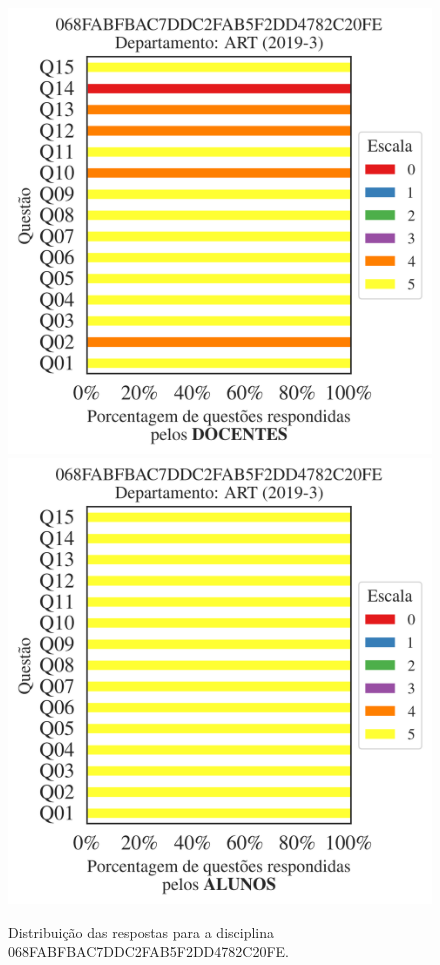 \documentclass[a4paper,10pt]{article}
\begin{document}
\begin{figure}[h]
\centering
\includegraphics[width=0.485\linewidth]{analise_disciplina_departamento_ART_068FABFBAC7DDC2FAB5F2DD4782C20FE_docentes.png}
\includegraphics[width=0.485\linewidth]{analise_disciplina_departamento_ART_068FABFBAC7DDC2FAB5F2DD4782C20FE_alunos.png}
\caption{\label{fig:analise_geral_departamento}                Distribuição das respostas para a disciplina 068FABFBAC7DDC2FAB5F2DD4782C20FE. }
\end{figure}
\end{document}
